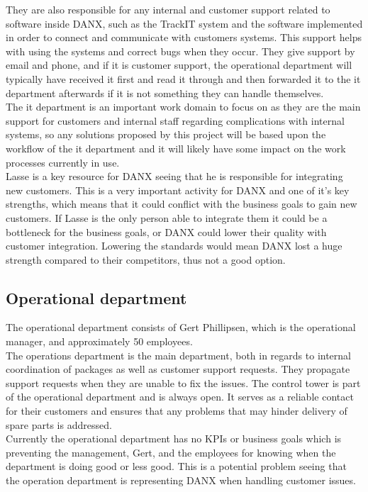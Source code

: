 They are also responsible for any internal and customer support related to software inside DANX, such as the TrackIT system and the software implemented in order to connect and communicate with customers systems. This support helps with using the systems and correct bugs when they occur. They give support by email and phone, and if it is customer support, the operational department will typically have received it first and read it through and then forwarded it to the it department afterwards if it is not something they can handle themselves. \\

The it department is an important work domain to focus on as they are the main support for customers and internal staff regarding complications with internal systems, so any solutions proposed by this project will be based upon the workflow of the it department and it will likely have some impact on the work processes currently in use.\\

Lasse is a key resource for DANX seeing that he is responsible for integrating new customers. This is a very important activity for DANX and one of it’s key strengths, which means that it could conflict with the business goals to gain new customers. If Lasse is the only person able to integrate them it could be a bottleneck for the business goals, or DANX could lower their quality with customer integration. Lowering the standards would mean DANX lost a huge strength compared to their competitors, thus not a good option.


\subsection{Operational department}
The operational department consists of Gert Phillipsen, which is the operational manager, and approximately 50 employees. \\
 
The operations department is the main department, both in regards to internal coordination of packages as well as customer support requests. They propagate support requests when they are unable to fix the issues. 
The control tower is part of the operational department and is always open. It serves as a reliable contact for their customers and ensures that any problems that may hinder delivery of spare parts is addressed. \\

Currently the operational department has no KPIs or business goals which is preventing the management, Gert, and the employees for knowing when the department is doing good or less good. This is a potential problem seeing that the operation department is representing DANX when handling customer issues. \\

